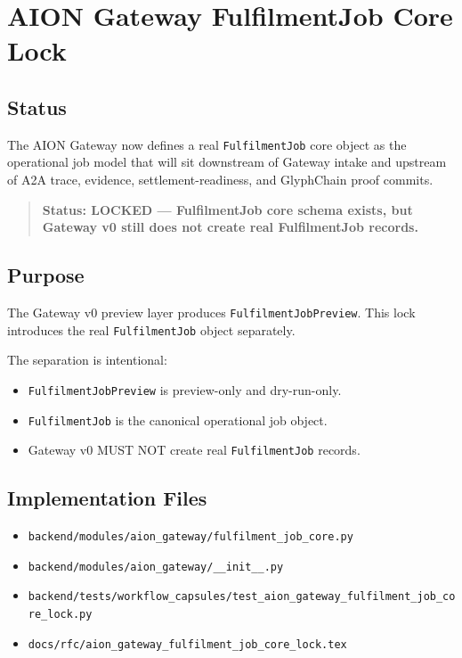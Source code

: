 \section{AION Gateway FulfilmentJob Core Lock}
\label{sec:aion-gateway-fulfilment-job-core-lock}

\subsection{Status}

The AION Gateway now defines a real \texttt{FulfilmentJob} core object as the operational job model that will sit downstream of Gateway intake and upstream of A2A trace, evidence, settlement-readiness, and GlyphChain proof commits.

\begin{quote}
\textbf{Status: LOCKED --- FulfilmentJob core schema exists, but Gateway v0 still does not create real FulfilmentJob records.}
\end{quote}

\subsection{Purpose}

The Gateway v0 preview layer produces \texttt{FulfilmentJobPreview}. This lock introduces the real \texttt{FulfilmentJob} object separately.

The separation is intentional:

\begin{itemize}
  \item \texttt{FulfilmentJobPreview} is preview-only and dry-run-only.
  \item \texttt{FulfilmentJob} is the canonical operational job object.
  \item Gateway v0 MUST NOT create real \texttt{FulfilmentJob} records.
\end{itemize}

\subsection{Implementation Files}

\begin{itemize}
  \item \texttt{backend/modules/aion\_gateway/fulfilment\_job\_core.py}
  \item \texttt{backend/modules/aion\_gateway/\_\_init\_\_.py}
  \item \texttt{backend/tests/workflow\_capsules/test\_aion\_gateway\_fulfilment\_job\_core\_lock.py}
  \item \texttt{docs/rfc/aion\_gateway\_fulfilment\_job\_core\_lock.tex}
\end{itemize}

